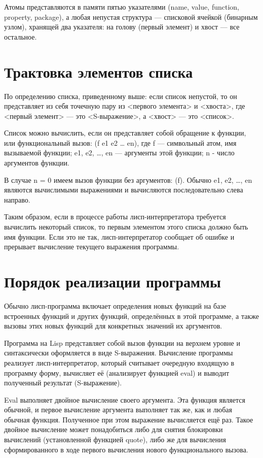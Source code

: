 Атомы представляются в памяти пятью указателями  (name, value, function, property, package), а любая непустая структура ---  списковой ячейкой (бинарным узлом), хранящей два указателя: на голову (первый элемент) и хвост --- все остальное.

\section{Трактовка элементов списка}

По определению списка, приведенному выше: если список непустой, то он представляет из себя точечную пару из  <первого элемента> и <хвоста>, где <первый элемент> --- это <S-выражение>, а <хвост> --- это <список>.

Список можно вычислить, если он представляет собой обращение к  функции, или функциональный вызов: (f e1 e2 … en), где f --- символьный атом, имя вызываемой функции; e1, e2, …, en --- аргументы этой функции; n - число аргументов функции.

В случае n = 0 имеем вызов функции без аргументов: (f). Обычно e1, e2, …, en являются вычислимыми выражениями и вычисляются последовательно слева направо.

Таким образом, если в процессе работы лисп-интерпретатора  требуется вычислить некоторый список, то первым элементом этого   списка должно быть имя функции. Если это не так, лисп-интерпретатор  сообщает об ошибке и прерывает вычисление текущего выражения  программы.

\section{Порядок реализации программы}

Обычно лисп-программа включает определения новых функций на базе встроенных функций и других функций, определённых в этой программе, а также вызовы этих новых функций для конкретных значений их аргументов.

Программа на Lisp представляет собой вызов функции на верхнем уровне и синтаксически оформляется в виде S-выражения. Вычисление программы реализует лисп-интерпретатор, который считывает очередную входящую в программу форму, вычисляет её (анализирует функцией eval) и выводит полученный результат (S-выражение).

Eval выполняет двойное  вычисление своего аргумента. Эта функция является обычной, и первое  вычисление аргумента выполняет так же, как и любая обычная функция.  Полученное при этом выражение вычисляется ещё раз. Такое двойное  вычисление может понадобиться либо для снятия блокировки вычислений (установленной функцией quote), либо же для вычисления сформированного в ходе первого вычисления нового функционального вызова.



